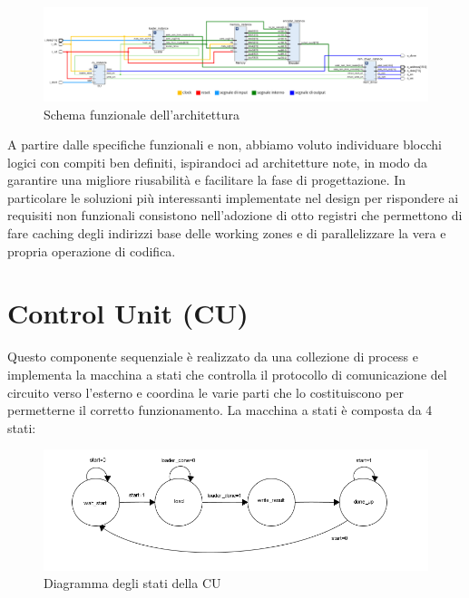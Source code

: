 \documentclass[10pt,english, openany]{book}
\begin{document}
\begin{figure}[h!]
    \centering
    \includegraphics[scale=0.32]{schematics.png}
    \caption{Schema funzionale dell'architettura}
    \label{fig:schematic}
\end{figure}{}



A partire dalle specifiche funzionali e non, abbiamo voluto individuare blocchi logici con compiti ben definiti, ispirandoci ad architetture note, in modo da garantire una migliore riusabilità e facilitare la fase di progettazione. In particolare le soluzioni più interessanti implementate nel design per rispondere ai requisiti non funzionali consistono nell’adozione di otto registri che permettono di fare caching degli indirizzi base delle working zones e di parallelizzare la vera e propria operazione di codifica.

\section{Control Unit (CU)}

Questo componente sequenziale è realizzato da una collezione di process e implementa la macchina a stati che controlla il protocollo di comunicazione del circuito verso l’esterno e coordina le varie parti che lo costituiscono per permetterne il corretto funzionamento. La macchina a stati è composta da 4 stati:

\begin{figure}[h!] %
    \centering
    \includegraphics[scale=0.75]{stati_cu.png}
    \caption{Diagramma degli stati della CU}
    \label{fig:stati_cu}
\end{figure}{}
\end{document}
